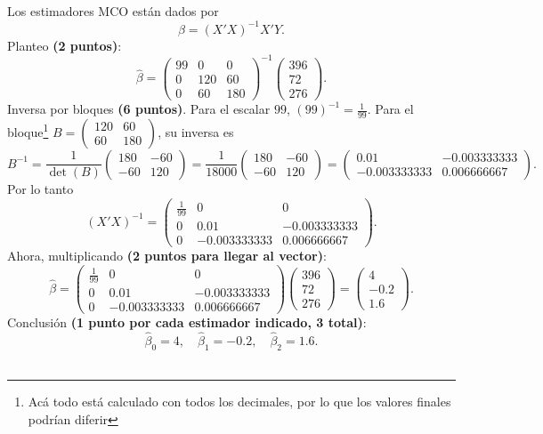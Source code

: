 \documentclass[10pt,a4paper]{article}
\begin{document}
\begin{enumerate}
\begin{enumerate}
    {\color{blue}
    Los estimadores MCO están dados por
    \[
    \hat{\beta} = (X'X)^{-1} X'Y.
    \]
    Planteo \textbf{(2 puntos)}:
    \[
    \hat{\beta} 
    = 
    \begin{pmatrix}
    99 & 0 & 0\\
    0 & 120 & 60\\
    0 & 60 & 180
    \end{pmatrix}^{-1}
    \begin{pmatrix}
    396\\
    72\\
    276
    \end{pmatrix}.
    \]
    Inversa por bloques \textbf{(6 puntos)}. Para el escalar $99$, $(99)^{-1}=\tfrac{1}{99}$. Para el bloque\footnote{Acá todo está calculado con todos los decimales, por lo que los valores finales podrían diferir}
    \(
    B=
    \begin{pmatrix}
    120 & 60\\
    60 & 180
    \end{pmatrix}
    \),
    su inversa es
    \[
    B^{-1}
    = \frac{1}{\det(B)}
    \begin{pmatrix}
    180 & -60\\
    -60 & 120
    \end{pmatrix}
    = \frac{1}{18000}
    \begin{pmatrix}
    180 & -60\\
    -60 & 120
    \end{pmatrix}
    =
    \begin{pmatrix}
    0.01 & -0.003333333\\
    -0.003333333 & 0.006666667
    \end{pmatrix}.
    \]
    Por lo tanto
    \[
    (X'X)^{-1}
    =
    \begin{pmatrix}
    \tfrac{1}{99} & 0 & 0\\
    0 & 0.01 & -0.003333333\\
    0 & -0.003333333 & 0.006666667
    \end{pmatrix}.
    \]
    Ahora, multiplicando \textbf{(2 puntos para llegar al vector)}:
    \[
    \hat{\beta}
    =
    \begin{pmatrix}
    \tfrac{1}{99} & 0 & 0\\
    0 & 0.01 & -0.003333333\\
    0 & -0.003333333 & 0.006666667
    \end{pmatrix}
    \begin{pmatrix}
    396\\
    72\\
    276
    \end{pmatrix}
    =
    \begin{pmatrix}
    4\\
    -0.2\\
    1.6
    \end{pmatrix}.
    \]
    Conclusión \textbf{(1 punto por cada estimador indicado, 3 total)}:
    \[
    \boxed{\hat{\beta}_0 = 4,\quad \hat{\beta}_1 = -0.2,\quad \hat{\beta}_2 = 1.6.}
    \]
    }\\[0.25em]
    

\end{enumerate}
\end{enumerate}
\end{document}
